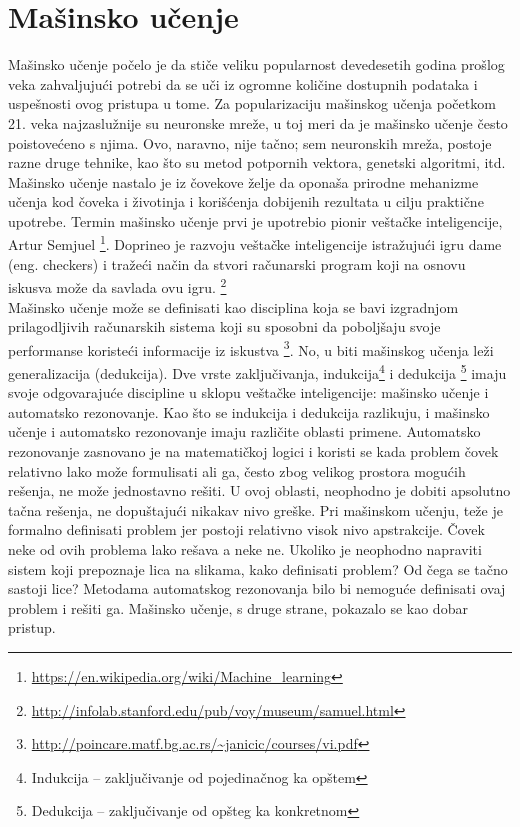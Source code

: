 \chapter{Mašinsko učenje}

Mašinsko učenje počelo je da stiče veliku popularnost devedesetih godina prošlog veka zahvaljujući potrebi da se uči iz ogromne količine dostupnih podataka i uspešnosti ovog pristupa u tome. Za popularizaciju mašinskog učenja početkom 21. veka najzaslužnije su neuronske mreže, u toj meri da je mašinsko učenje često poistovećeno s njima. Ovo, naravno, nije tačno; sem neuronskih mreža, postoje razne druge tehnike, kao što su metod potpornih vektora, genetski algoritmi, itd. \\

Mašinsko učenje nastalo je iz čovekove želje da oponaša prirodne mehanizme učenja kod čoveka i životinja i korišćenja dobijenih rezultata u cilju praktične upotrebe. Termin mašinsko učenje prvi je upotrebio pionir veštačke inteligencije, Artur Semjuel \footnote{\url{https://en.wikipedia.org/wiki/Machine_learning}}. Doprineo je razvoju veštačke inteligencije istražujući igru dame (eng. checkers) i tražeći način da stvori računarski program koji na osnovu iskusva može da savlada ovu igru. \footnote{\url{http://infolab.stanford.edu/pub/voy/museum/samuel.html}} \\

Mašinsko učenje može se definisati kao disciplina koja se bavi izgradnjom prilagodljivih računarskih sistema koji su sposobni da poboljšaju svoje performanse koristeći informacije iz iskustva \footnote{\url{http://poincare.matf.bg.ac.rs/~janicic/courses/vi.pdf}}. No, u biti mašinskog učenja leži generalizacija (dedukcija). Dve vrste zaključivanja, indukcija\footnote{Indukcija -- zaključivanje od pojedinačnog ka opštem} i dedukcija \footnote{Dedukcija -- zaključivanje od opšteg ka konkretnom} imaju svoje odgovarajuće discipline u sklopu veštačke inteligencije: mašinsko učenje i automatsko rezonovanje. Kao što se indukcija i dedukcija razlikuju, i mašinsko učenje i automatsko rezonovanje imaju različite oblasti primene. Automatsko rezonovanje zasnovano je na matematičkoj logici i koristi se kada problem čovek relativno lako može formulisati ali ga, često zbog velikog prostora mogućih rešenja, ne može jednostavno rešiti. U ovoj oblasti, neophodno je dobiti apsolutno tačna rešenja, ne dopuštajući nikakav nivo greške.
Pri mašinskom učenju, teže je formalno definisati problem jer postoji relativno visok nivo apstrakcije. Čovek neke od ovih problema lako rešava a neke ne. Ukoliko je neophodno napraviti sistem koji prepoznaje lica na slikama, kako definisati problem? Od čega se tačno sastoji lice? Metodama automatskog rezonovanja bilo bi nemoguće definisati ovaj problem i rešiti ga. Mašinsko učenje, s druge strane, pokazalo se kao dobar pristup. \\

